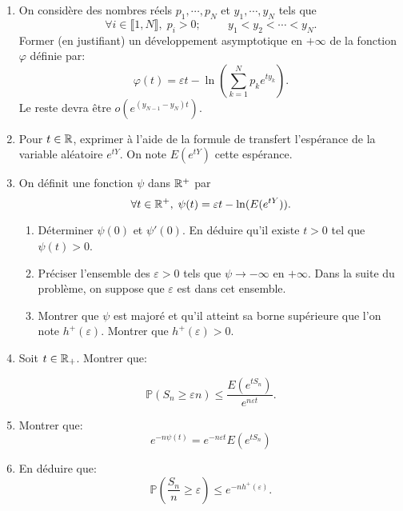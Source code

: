 \begin{enumerate}
 \item On considère des nombres réels $p_1,\cdots, p_N$ et $y_1,\cdots, y_N$ tels que
\begin{displaymath}
 \forall i\in \llbracket 1,N\rrbracket, \; p_i >0; \hspace{1cm} y_1 < y_2 < \cdots < y_N .
\end{displaymath}
Former (en justifiant) un développement asymptotique  en $+\infty$ de la fonction $\varphi$ définie par:
\begin{displaymath}
 \varphi(t) = \varepsilon t - \ln\left( \sum_{k=1}^{N} p_k e^{ty_k}\right).
\end{displaymath}
Le reste devra être $o(e^{(y_{N-1}- y_N)t})$.

 \item Pour $t\in \mathbb{R}$, exprimer à l'aide de la formule de transfert l'espérance de la variable aléatoire $e^{tY}$. On note $E(e^{tY})$ cette espérance.
 
 \item On définit une fonction $\psi$ dans $\mathbb{R}^+$ par 
\begin{displaymath}
 \forall t \in \mathbb{R}^+, \; \psi(t) = \varepsilon t - \ln ( E(e^{tY})).
\end{displaymath}
 \begin{enumerate}
  \item Déterminer $\psi(0)$ et $\psi'(0)$. En déduire qu'il existe $t>0$ tel que $\psi(t)>0$.
  \item Préciser l'ensemble des $\varepsilon >0$ tels que $\psi \rightarrow -\infty$ en $+\infty$. Dans la suite du problème, on suppose que $\varepsilon$ est dans cet ensemble.
  \item Montrer que $\psi$ est majoré et qu'il atteint sa borne supérieure que l'on note $h^+(\varepsilon)$. Montrer que $h^+(\varepsilon)>0$.
 \end{enumerate}
 
 \item Soit $t\in \mathbb{R}_{+}$. Montrer que:
 

 \[ \mathbb{P}(S_{n}\geq \varepsilon n) \leq \frac{E(e^{tS_{n}})}{e^{n\varepsilon t}}.\]
 
 \item Montrer que:
\begin{displaymath}
 e^{-n \psi(t)} = e^{-n \varepsilon t} E(e^{tS_n})
\end{displaymath}
 
 \item En déduire que:
 \[ \mathbb{P}\left ( \frac{S_{n}}{n}\geq \varepsilon \right ) \leq e^{-nh^{+}(\varepsilon)}.\]
\end{enumerate}

